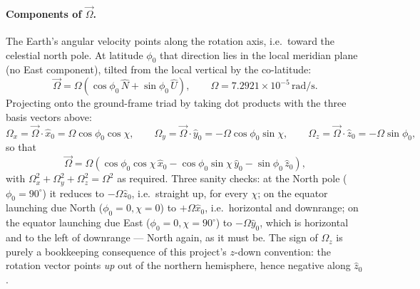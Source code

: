 \paragraph{Components of $\vec{\Omega}$.} The Earth's angular velocity points along the rotation
axis, i.e.\ toward the celestial north pole. At latitude $\phi_0$ that direction lies in the local
meridian plane (no East component), tilted from the local vertical by the co-latitude:
\begin{equation}
    \vec{\Omega} = \Omega\left(\cos\phi_0\,\hat{N} + \sin\phi_0\,\hat{U}\right), \qquad
    \Omega = 7.2921\times10^{-5}\,\mathrm{rad/s}.
\end{equation}
Projecting onto the ground-frame triad by taking dot products with the three basis vectors above:
\begin{equation}
    \Omega_x = \vec{\Omega}\cdot\hat{x}_0 = \Omega\cos\phi_0\cos\chi, \qquad
    \Omega_y = \vec{\Omega}\cdot\hat{y}_0 = -\Omega\cos\phi_0\sin\chi, \qquad
    \Omega_z = \vec{\Omega}\cdot\hat{z}_0 = -\Omega\sin\phi_0,
\end{equation}
so that
\begin{equation} \label{eq:omega_components}
    \vec{\Omega} = \Omega\left(\cos\phi_0\cos\chi\,\hat{x}_0
        - \cos\phi_0\sin\chi\,\hat{y}_0 - \sin\phi_0\,\hat{z}_0\right),
\end{equation}
with $\Omega_x^2+\Omega_y^2+\Omega_z^2=\Omega^2$ as required. Three sanity checks: at the North
pole ($\phi_0=90^\circ$) it reduces to $-\Omega\hat{z}_0$, i.e.\ straight up, for every $\chi$; on
the equator launching due North ($\phi_0=0,\chi=0$) to $+\Omega\hat{x}_0$, i.e.\ horizontal and
downrange; on the equator launching due East ($\phi_0=0,\chi=90^\circ$) to $-\Omega\hat{y}_0$,
which is horizontal and to the left of downrange --- North again, as it must be. The sign of
$\Omega_z$ is purely a bookkeeping consequence of this project's $z$-down convention: the rotation
vector points \emph{up} out of the northern hemisphere, hence negative along $\hat{z}_0$.

